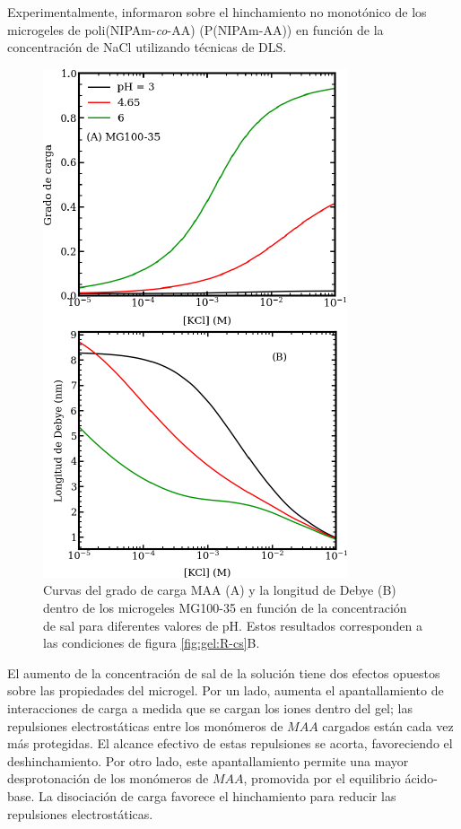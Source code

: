 Experimentalmente, \citet{CaprilesGonzalez2008} informaron sobre el hinchamiento no monot\'onico de los microgeles de poli(NIPAm-\emph{co}-AA) (P(NIPAm-AA)) en funci\'on de la concentraci\'on de NaCl utilizando t\'ecnicas de DLS.




\begin{figure}[!tb]
	\centering
	\includegraphics[width=0.55\linewidth]{Figures/graph-gel/f-cs.pdf}
	\caption{Curvas del grado de carga MAA (A) y la longitud de Debye (B) dentro de los microgeles MG100-35 en funci\'on de la concentraci\'on de sal para diferentes valores de pH.
		Estos resultados corresponden a las condiciones de figura \ref{fig:gel:R-cs}B.}
	\label{fig:gel:f-cs}
\end{figure}

El aumento de la concentraci\'on de sal de la soluci\'on tiene dos efectos opuestos sobre las propiedades del microgel. Por un lado, aumenta el apantallamiento de interacciones de carga a medida que se cargan los iones dentro del gel; las repulsiones electrost\'aticas entre los mon\'omeros de $MAA$ cargados est\'an cada vez m\'as protegidas. El alcance efectivo de estas repulsiones se acorta, favoreciendo el deshinchamiento. Por otro lado, este apantallamiento permite una mayor desprotonaci\'on de los mon\'omeros de $MAA$, promovida por el equilibrio \'acido-base. La disociaci\'on de carga favorece el hinchamiento para reducir las repulsiones electrost\'aticas.

